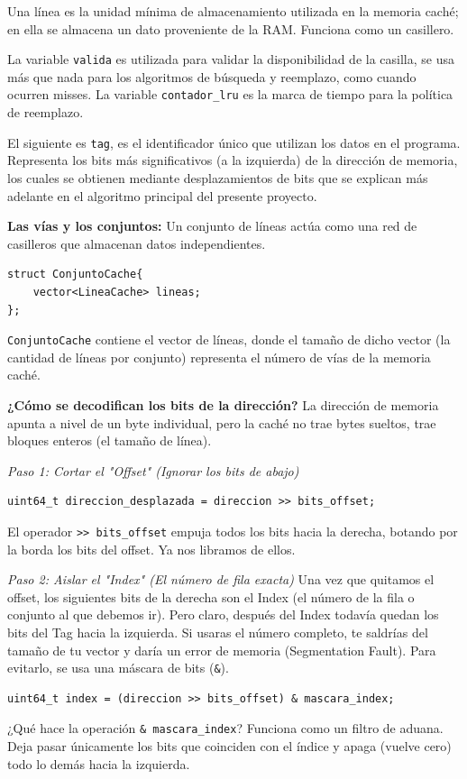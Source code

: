 \documentclass[12pt,a4paper]{article}
\begin{document}
Una línea es la unidad mínima de almacenamiento utilizada en la memoria caché; en ella se almacena un dato proveniente de la RAM. Funciona como un casillero.

La variable \texttt{valida} es utilizada para validar la disponibilidad de la casilla, se usa más que nada para los algoritmos de búsqueda y reemplazo, como cuando ocurren misses. La variable \texttt{contador\_lru} es la marca de tiempo para la política de reemplazo. 

El siguiente es \texttt{tag}, es el identificador único que utilizan los datos en el programa. Representa los bits más significativos (a la izquierda) de la dirección de memoria, los cuales se obtienen mediante desplazamientos de bits que se explican más adelante en el algoritmo principal del presente proyecto.

\textbf{Las vías y los conjuntos:}
Un conjunto de líneas actúa como una red de casilleros que almacenan datos independientes.
\begin{verbatim}
struct ConjuntoCache{    
    vector<LineaCache> lineas;
};
\end{verbatim}
\texttt{ConjuntoCache} contiene el vector de líneas, donde el tamaño de dicho vector (la cantidad de líneas por conjunto) representa el número de vías de la memoria caché.

\textbf{¿Cómo se decodifican los bits de la dirección?}
La dirección de memoria apunta a nivel de un byte individual, pero la caché no trae bytes sueltos, trae bloques enteros (el tamaño de línea).

\textit{Paso 1: Cortar el "Offset" (Ignorar los bits de abajo)}
\begin{verbatim}
uint64_t direccion_desplazada = direccion >> bits_offset;
\end{verbatim}
El operador \texttt{>> bits\_offset} empuja todos los bits hacia la derecha, botando por la borda los bits del offset. Ya nos libramos de ellos.

\textit{Paso 2: Aislar el "Index" (El número de fila exacta)}
Una vez que quitamos el offset, los siguientes bits de la derecha son el Index (el número de la fila o conjunto al que debemos ir). Pero claro, después del Index todavía quedan los bits del Tag hacia la izquierda. Si usaras el número completo, te saldrías del tamaño de tu vector y daría un error de memoria (Segmentation Fault). Para evitarlo, se usa una máscara de bits (\texttt{\&}).
\begin{verbatim}
uint64_t index = (direccion >> bits_offset) & mascara_index;
\end{verbatim}
¿Qué hace la operación \texttt{\& mascara\_index}? Funciona como un filtro de aduana. Deja pasar únicamente los bits que coinciden con el índice y apaga (vuelve cero) todo lo demás hacia la izquierda.
\end{document}
